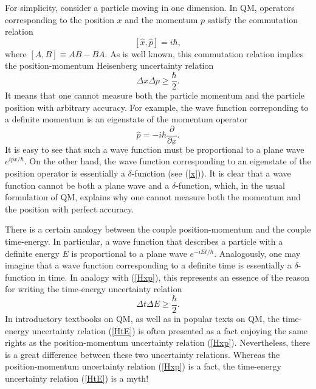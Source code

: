 \documentclass[12pt]{article}
\begin{document}
For simplicity, consider a particle moving in one dimension.
In QM, operators corresponding to the position $x$ and the momentum $p$ satisfy 
the commutation relation
\begin{equation}\label{comrelxp}
[\hat{x},\hat{p}]=i\hbar ,
\end{equation}
where $[A,B]\equiv AB-BA$.
As is well known, this commutation relation implies the 
position-momentum Heisenberg uncertainty relation
\begin{equation}\label{Hxp}
\Delta x \Delta p \geq \frac{\hbar}{2} .
\end{equation}
It means that one cannot measure both the particle momentum and 
the particle position with arbitrary accuracy. For example, 
the wave function correponding to a definite momentum 
is an eigenstate of the momentum operator
\begin{equation}\label{momop}
\hat{p}=-i\hbar\frac{\partial}{\partial x} .
\end{equation}
It is easy to see that such a wave function must be proportional
to a plane wave $e^{ipx/\hbar}$. 
On the other hand, the wave function corresponding 
to an eigenstate of the position operator is essentially a $\delta$-function 
(see (\ref{x})). It is clear that a wave function cannot be 
both a plane wave and a $\delta$-function, which, in the usual
formulation of QM, explains why one cannot measure both  
the momentum and the position with perfect accuracy.

There is a certain analogy between the couple position-momentum 
and the couple time-energy. In particular, a wave function
that describes a particle with a definite energy $E$ is proportional to
a plane wave $e^{-iEt/\hbar}$. Analogously, one may imagine that 
a wave function corresponding to a definite time is essentially 
a $\delta$-function in time. In analogy with (\ref{Hxp}),
this represents an essence of the reason 
for writing the time-energy uncertainty relation
\begin{equation}\label{HtE}
\Delta t \Delta E \geq \frac{\hbar}{2} .
\end{equation}   
In introductory textbooks on QM, 
as well as in popular texts on QM, the time-energy uncertainty relation
(\ref{HtE}) is often presented as a fact enjoying the same rights 
as the position-momentum uncertainty relation (\ref{Hxp}). 
Nevertheless, there is a great difference between these two uncertainty
relations. Whereas the position-momentum uncertainty relation (\ref{Hxp}) 
is a fact, the time-energy uncertainty relation (\ref{HtE}) is a myth!
\end{document}

